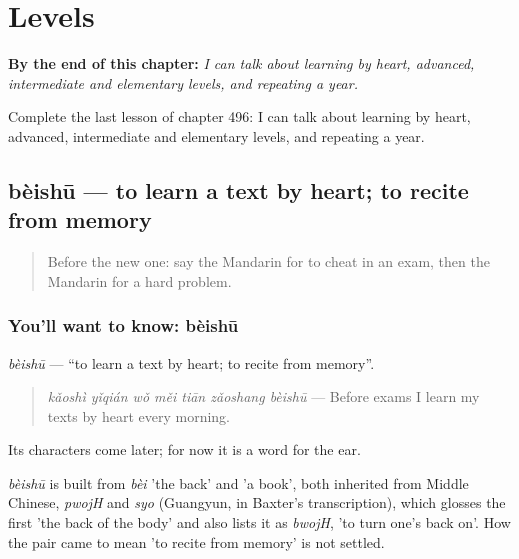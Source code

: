 
\chapter{Levels}
\label{ch:zh-levels}

\begin{chapteropening}
\textbf{By the end of this chapter:} \emph{I can talk about learning by heart, advanced, intermediate and elementary levels, and repeating a year.}

Complete the last lesson of chapter 496: I can talk about learning by heart, advanced, intermediate and elementary levels, and repeating a year.
\end{chapteropening}

\section[bèishū]{bèishū — to learn a text by heart; to recite from memory}

\label{lesson:ZH-C496-beishu}



\begin{quote}
Before the new one: say the Mandarin for to cheat in an exam, then the Mandarin for a hard problem.
\end{quote}

\subsection*{You'll want to know: bèishū}
\emph{bèishū} — \textquotedblleft{}to learn a text by heart; to recite from memory\textquotedblright{}.

\begin{quote}
\emph{kǎoshì yǐqián wǒ měi tiān zǎoshang bèishū} — Before exams I learn my texts by heart every morning.
\end{quote}

Its characters come later; for now it is a word for the ear.

\begin{cousinweb}
\emph{bèishū} is built from \emph{bèi} 'the back' and  'a book', both inherited from Middle Chinese, \emph{pwojH} and \emph{syo} (Guangyun, in Baxter's transcription), which glosses the first 'the back of the body' and also lists it as \emph{bwojH}, 'to turn one's back on'. How the pair came to mean 'to recite from memory' is not settled.
\end{cousinweb}

